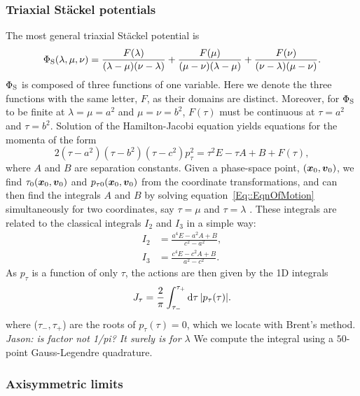 \documentclass[useAMS,usenatbib,fleqn,a4paper]{mn2e}
\begin{document}
\subsubsection{Triaxial St\"ackel potentials}

The most general triaxial St\"ackel potential is
\begin{equation}
\Phi_{\rm S}(\lambda,\mu,\nu) = \frac{F(\lambda)}{(\lambda-\mu)(\nu-\lambda)}+\frac{F(\mu)}{(\mu-\nu)(\lambda-\mu)}+\frac{F(\nu)}{(\nu-\lambda)(\mu-\nu)}.
\end{equation}
$\Phi_{\rm S}$ is composed of three functions of one variable. Here we denote the
three functions with the same letter, $F$, as their domains are distinct.
Moreover, for $\Phi_{\rm S}$ to be finite at $\lambda=\mu=a^2$ and
$\mu=\nu=b^2$, $F(\tau)$ must be continuous at $\tau=a^2$ and $\tau=b^2$.
Solution of  the Hamilton-Jacobi equation
\citep{deZeeuw1985a} yields equations for the momenta of the form
\begin{equation}
2(\tau-a^2)(\tau-b^2)(\tau-c^2)p_\tau^2=\tau^2 E -\tau A+B + F(\tau),
\label{Eq::EqnOfMotion}
\end{equation}
 where $A$ and $B$ are separation constants.  Given a phase-space
point, $(\vx_0,\vv_0)$, we find $\tau_0(\vx_0,\vv_0)$ and $p_{\tau
0}(\vx_0,\vv_0)$ from  the coordinate transformations, and can then find the
integrals $A$ and $B$ by solving equation~\eqref{Eq::EqnOfMotion} simultaneously 
for two coordinates, say $\tau=\mu$ and $\tau=\lambda$ \citep[see][for more details]{deZeeuw1985a}. These integrals are related to
the classical integrals $I_2$ and $I_3$ in a simple way:
\begin{equation}
\begin{split}
I_2&=\frac{a^4 E-a^2 A+B}{c^2-a^2},\\
I_3&=\frac{c^4E-c^2 A+B}{a^2-c^2}.
\end{split}
\end{equation}
As $p_\tau$ is a function of  only $\tau$, the actions are then given by the
1D integrals
\begin{equation}
J_\tau = \frac{2}{\pi}\int_{\tau_-}^{\tau_+} \mathrm{d}\tau\,|p_\tau(\tau)|.
\label{Eq::action}
\end{equation}
where ($\tau_-,\tau_+$) are the roots of $p_\tau(\tau)=0$, which we locate
with Brent's method. {\sl Jason: is factor not 1/pi? It surely is for
$\lambda$} We compute the integral using a $50$-point Gauss-Legendre
quadrature.

\subsubsection{Axisymmetric limits}
\end{document}
